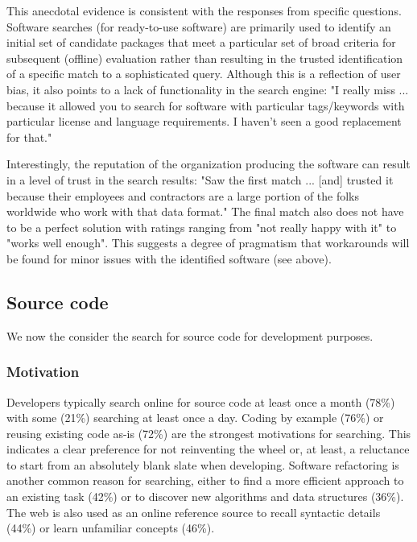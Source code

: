 \documentclass{casicswhitepaper}
\begin{document}
This anecdotal evidence is consistent with the responses from specific questions. Software searches (for ready-to-use software) are primarily used to identify an initial set of candidate packages that meet a particular set of broad criteria for subsequent (offline) evaluation rather than resulting in the trusted identification of a specific match to a sophisticated query. Although this is a reflection of user bias, it also points to a lack of functionality in the search engine: "I really miss ... because it allowed you to search for software with particular tags/keywords with particular license and language requirements. I haven't seen a good replacement for that."

Interestingly, the reputation of the organization producing the software can result in a level of trust in the search results: "Saw the first match ... [and] trusted it because their employees and contractors are a large portion of the folks worldwide who work with that data format." The final match also does not have to be a perfect solution with ratings ranging from "not really happy with it" to "works well enough". This suggests a degree of pragmatism that workarounds will be found for minor issues with the identified software (see above).

\subsection{Source code}

We now the consider the search for source code for development purposes.

\subsubsection{Motivation}

Developers typically search online for source code at least once a month (78\%) with some (21\%) searching at least once a day. Coding by example (76\%) or reusing existing code as-is (72\%) are the strongest motivations for searching. This indicates a clear preference for not reinventing the wheel or, at least, a reluctance to start from an absolutely blank slate when developing. Software refactoring is another common reason for searching, either to find a more efficient approach to an existing task (42\%) or to discover new algorithms and data structures (36\%). The web is also used as an online reference source to recall syntactic details (44\%) or learn unfamiliar concepts (46\%). 
\end{document}
